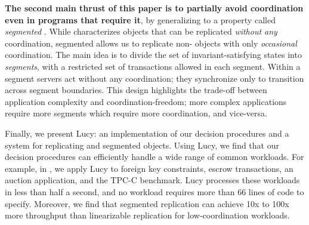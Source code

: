 
\textbf{The second main thrust of this paper is to partially avoid coordination
even in programs that require it}, by generalizing \invariantconfluence{} to a
property called \emph{segmented \invariantconfluence{}}. While
\invariantconfluence{} characterizes objects that can be replicated
\emph{without any} coordination, segmented \invariantconfluence{} allows us to
replicate non-\invariantconfluent{} objects with only \emph{occasional}
coordination. The main idea is to divide the set of invariant-satisfying states
into \emph{segments}, with a restricted set of transactions allowed in each
segment.  Within a segment servers act without any coordination; they
synchronize only to transition across segment boundaries. This design
highlights the trade-off between application complexity and
coordination-freedom; more complex applications require more segments which
require more coordination, and vice-versa.

Finally, we present Lucy: an implementation of our decision procedures and a
system for replicating \invariantconfluent{} and segmented
\invariantconfluent{} objects. Using Lucy, we find that our decision
procedures can efficiently handle a wide range of common workloads. For
example, in , we apply Lucy to foreign key constraints,
escrow transactions, an auction application, and the TPC-C benchmark. Lucy
processes these workloads in less than half a second, and no workload requires
more than 66 lines of code to specify. Moreover, we find that segmented
\invariantconfluent{} replication can achieve 10x to 100x more throughput than
linearizable replication for low-coordination workloads.


